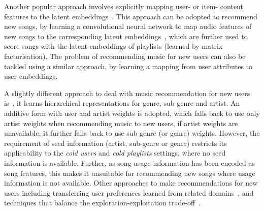 Another popular approach involves explicitly mapping user- or item- content features to the latent embeddings~\cite{Gantner:2010}.
This approach can be adopted to recommend new songs, 
\eg by learning a convolutional neural network to map audio features of new songs to 
the corresponding latent embeddings~\cite{van2013deep},
which are further used to score songs with the latent embeddings of playlists (learned by matrix factorisation).
The problem of recommending music for new users can also be tackled using a similar approach, \eg
by learning a mapping from user attributes to user embeddings.

A slightly different approach to deal with music recommendation for new users is~\cite{ben2017groove},
it learns hierarchical representations for genre, sub-genre and artist.
An additive form with user and artist weights is adopted, which falls back to use only artist weights
when recommending music to new users, if artist weights are unavailable, it further falls back to use 
sub-genre (or genre) weights.
However, the requirement of seed information (\eg artist, sub-genre or genre) restricts its applicability to
the \emph{cold users} and \emph{cold playlists} settings, where no seed information is available.
Further, as song usage information has been encoded as song features, this makes it unsuitable for recommending
new songs where usage information is not available.
%
Other approaches to make recommendations for new users including transferring user preferences learned 
from related domains~\cite{hu2010study,aizenberg2012build},
and techniques that balance the exploration-exploitation trade-off~\cite{wang2014exploration,liebman2015dj}.


